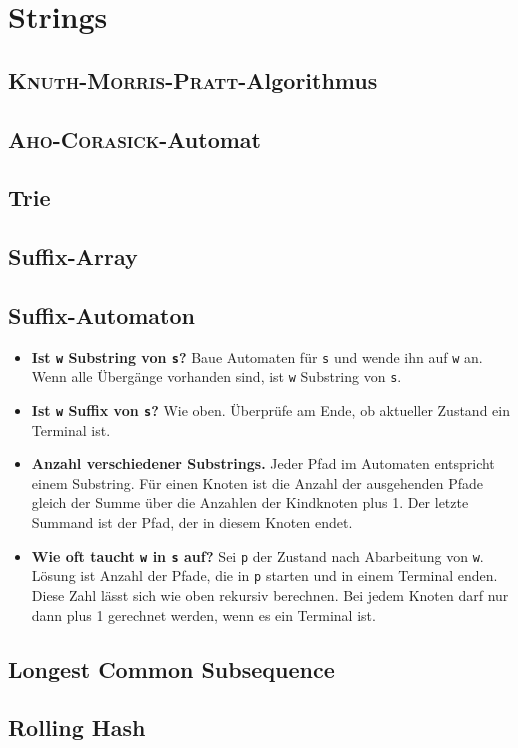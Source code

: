 \section{Strings}

\subsection{\textsc{Knuth-Morris-Pratt}-Algorithmus}


\subsection{\textsc{Aho-Corasick}-Automat}


\subsection{Trie}


\subsection{Suffix-Array}


\subsection{Suffix-Automaton}

\begin{itemize}[nosep]
	\item \textbf{Ist \lstinline{w} Substring von \lstinline{s}?}
	Baue Automaten für \lstinline{s} und wende ihn auf \lstinline{w} an.
	Wenn alle Übergänge vorhanden sind, ist \lstinline{w} Substring von \lstinline{s}.

	\item \textbf{Ist \lstinline{w} Suffix von \lstinline{s}?}
	Wie oben.
	Überprüfe am Ende, ob aktueller Zustand ein Terminal ist.

	\item \textbf{Anzahl verschiedener Substrings.}
	Jeder Pfad im Automaten entspricht einem Substring.
	Für einen Knoten ist die Anzahl der ausgehenden Pfade gleich der Summe über die Anzahlen der Kindknoten plus 1.
	Der letzte Summand ist der Pfad, der in diesem Knoten endet.

	\item \textbf{Wie oft taucht \lstinline{w} in \lstinline{s} auf?}
	Sei \lstinline{p} der Zustand nach Abarbeitung von \lstinline{w}.
	Lösung ist Anzahl der Pfade, die in \lstinline{p} starten und in einem Terminal enden.
	Diese Zahl lässt sich wie oben rekursiv berechnen.
	Bei jedem Knoten darf nur dann plus 1 gerechnet werden, wenn es ein Terminal ist.
\end{itemize}

\subsection{Longest Common Subsequence}


\subsection{Rolling Hash}

